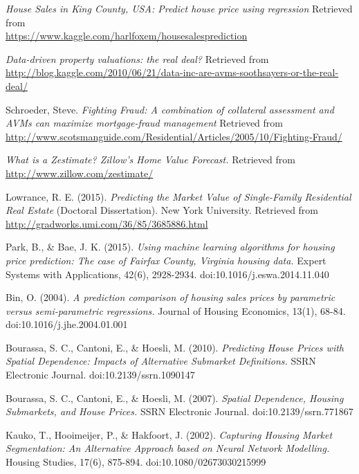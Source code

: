 \documentclass[10pt]{article}
\begin{document}
\begin{multicols}{2}
\begin{thebibliography}{13}
			\textit{House Sales in King County, USA: Predict house price using regression}
			Retrieved from \\ \small{\url{https://www.kaggle.com/harlfoxem/housesalesprediction}}	
			
			\textit{Data-driven property valuations: the real deal?}
			Retrieved from \\ \small{\url{http://blog.kaggle.com/2010/06/21/data-inc-are-avms-soothsayers-or-the-real-deal/}}
			
			Schroeder, Steve.
			\textit{Fighting Fraud: A combination of collateral assessment and AVMs can maximize mortgage-fraud management}
			Retrieved from \\ \small{\url{http://www.scotsmanguide.com/Residential/Articles/2005/10/Fighting-Fraud/}}
			
			\textit{What is a Zestimate? Zillow's Home Value Forecast.}
			Retrieved from \\
			\small{\url{http://www.zillow.com/zestimate/}}
			
			Lowrance, R. E. (2015).
			\textit{Predicting the Market Value of Single-Family Residential Real Estate}
			(Doctoral Dissertation). New York University. Retrieved from \small{\url{http://gradworks.umi.com/36/85/3685886.html}}
			
			Park, B., \& Bae, J. K. (2015).
			\textit{Using machine learning algorithms for housing price prediction: The case of Fairfax County, Virginia housing data.}
			Expert Systems with Applications, 42(6), 2928-2934. doi:10.1016/j.eswa.2014.11.040
			
			Bin, O. (2004).
			\textit{A prediction comparison of housing sales prices by parametric versus semi-parametric regressions.}
			Journal of Housing Economics, 13(1), 68-84. doi:10.1016/j.jhe.2004.01.001
			
			Bourassa, S. C., Cantoni, E., \& Hoesli, M. (2010). 
			\textit{Predicting House Prices with Spatial Dependence: Impacts of Alternative Submarket Definitions.}
			SSRN Electronic Journal. doi:10.2139/ssrn.1090147
			
			Bourassa, S. C., Cantoni, E., \& Hoesli, M. (2007).
			\textit{Spatial Dependence, Housing Submarkets, and House Prices.}
			SSRN Electronic Journal. doi:10.2139/ssrn.771867
			
			Kauko, T., Hooimeijer, P., \& Hakfoort, J. (2002).
			\textit{Capturing Housing Market Segmentation: An Alternative Approach based on Neural Network Modelling.}
			Housing Studies, 17(6), 875-894. doi:10.1080/02673030215999
			

\end{thebibliography}
\end{multicols}
\end{document}
